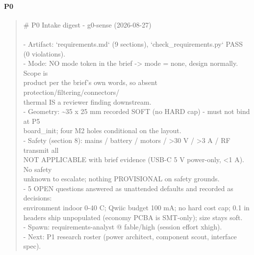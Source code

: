 \documentclass[11pt,a4paper]{article}
\begin{document}
\paragraph*{P0}
\begin{quote}\small\ttfamily\raggedright
\# P0 Intake digest - g0-sense (2026-08-27)\\
~\\
- Artifact: `requirements.md` (9 sections), `check\_requirements.py` PASS (0 violations).\\
- Mode: NO mode token in the brief -\textgreater{} mode = none, design normally. Scope is\\
  product per the brief's own words, so absent protection/filtering/connectors/\\
  thermal IS a reviewer finding downstream.\\
- Geometry: \textasciitilde{}35 x 25 mm recorded SOFT (no HARD cap) - must not bind at P5\\
  board\_init; four M2 holes conditional on the layout.\\
- Safety (section 8): mains / battery / motors / \textgreater{}30 V / \textgreater{}3 A / RF transmit all\\
  NOT APPLICABLE with brief evidence (USB-C 5 V power-only, \textless{}1 A). No safety\\
  unknown to escalate; nothing PROVISIONAL on safety grounds.\\
- 5 OPEN questions answered as unattended defaults and recorded as decisions:\\
  environment indoor 0-40 C; Qwiic budget 100 mA; no hard cost cap; 0.1 in\\
  headers ship unpopulated (economy PCBA is SMT-only); size stays soft.\\
- Spawn: requirements-analyst @ fable/high (session effort xhigh).\\
- Next: P1 research roster (power architect, component scout, interface spec).
\end{quote}
\end{document}
